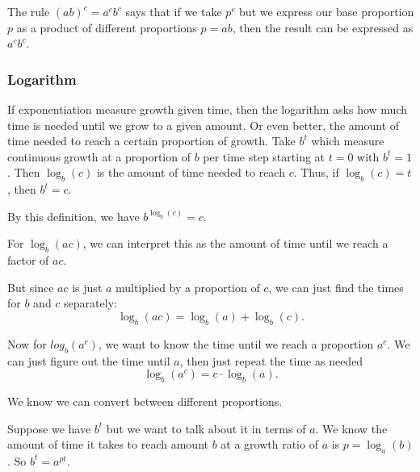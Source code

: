 \documentclass[../main.tex]{subfiles}
\begin{document}



The rule \( (ab)^c = a^c b^c \) says that if we take \( p^c \)
but we express our base proportion \( p \)
as a product of different proportions \( p = ab \),
then the result can be expressed as \( a^c b^{c} \).




\subsubsection{Logarithm}

If exponentiation measure growth given time,
then the logarithm asks how much time is needed until we grow to a given amount.
Or even better, the amount of time needed to reach a certain proportion of growth.
Take \( b^t \) which measure continuous growth at a proportion of \( b \) per time step
starting at \( t = 0 \) with \( b^t = 1 \).
Then \( \log_b(c) \) is the amount of time needed to reach \( c \).
Thus, if \( \log_b(c) = t \), then \( b^t = c \).




By this definition, we have \( b^{\log_b(c)} = c \).

For \( \log_b(ac) \),
we can interpret this as the amount of time until we reach a factor of \( ac \).





But since \( ac \) is just \( a \) multiplied by a proportion of \( c \),
we can just find the times for \( b \) and \( c \) separately:
\[ \log_b(ac) = \log_b(a) + \log_b(c). \]

Now for \( log_b(a^c) \),
we want to know the time until we reach a proportion \( a^c \).
We can just figure out the time until \( a \),
then just repeat the time as needed
\[ \log_b(a^c) = c \cdot \log_b(a). \]




\newpage
We know we can convert between different proportions.



Suppose we have \( b^t \) but we want to talk about it in terms of \( a \).
We know the amount of time it takes to reach amount \( b \) at a growth ratio of \( a \)
is \( p = \log_a(b) \).
So \( b^t = a^{pt} \).



\end{document}
